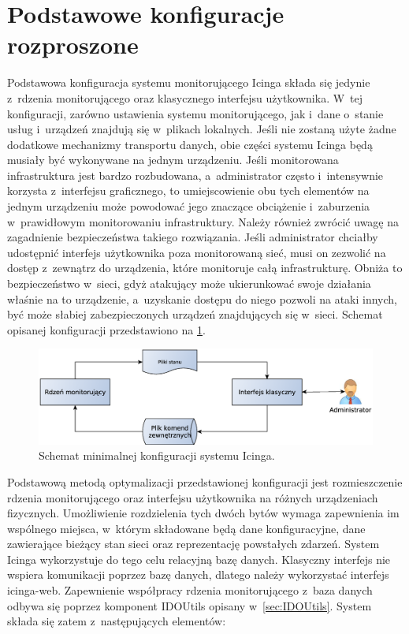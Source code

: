 \section[Konfiguracje rozproszone][Podstawowe konfiguracje rozproszone]{Podstawowe konfiguracje rozproszone}

Podstawowa konfiguracja systemu monitorującego Icinga składa się
jedynie z~rdzenia monitorującego oraz klasycznego interfejsu
użytkownika. W~tej konfiguracji, zarówno ustawienia systemu
monitorującego, jak i~dane o~stanie usług i~urządzeń znajdują się
w~plikach lokalnych. Jeśli nie zostaną użyte żadne dodatkowe
mechanizmy transportu danych, obie części systemu Icinga będą musiały
być wykonywane na jednym urządzeniu. Jeśli monitorowana infrastruktura
jest bardzo rozbudowana, a~administrator często i~intensywnie korzysta
z~interfejsu graficznego, to umiejscowienie obu tych elementów na
jednym urządzeniu może powodować jego znaczące obciążenie i~zaburzenia
w~prawidłowym monitorowaniu infrastruktury. Należy również zwrócić
uwagę na zagadnienie bezpieczeństwa takiego rozwiązania. Jeśli
administrator chciałby udostępnić interfejs użytkownika poza
monitorowaną sieć, musi on zezwolić na dostęp z~zewnątrz do
urządzenia, które monitoruje całą infrastrukturę. Obniża to
bezpieczeństwo w~sieci, gdyż atakujący może ukierunkować swoje
działania właśnie na to urządzenie, a~uzyskanie dostępu do niego
pozwoli na ataki innych, być może słabiej zabezpieczonych urządzeń
znajdujących się w~sieci. Schemat opisanej konfiguracji przedstawiono
na \ref{fig:icingaMini}.

\begin{figure}[ht]
  \caption{Schemat minimalnej konfiguracji systemu Icinga.}
  \label{fig:icingaMini}
\includegraphics[width=1\textwidth]{img/icingaMini}
\end{figure}

Podstawową metodą optymalizacji przedstawionej konfiguracji jest
rozmieszczenie rdzenia monitorującego oraz interfejsu użytkownika na
różnych urządzeniach fizycznych. Umożliwienie rozdzielenia tych dwóch
bytów wymaga zapewnienia im wspólnego miejsca, w~którym składowane
będą dane konfiguracyjne, dane zawierające bieżący stan sieci oraz
reprezentację powstałych zdarzeń. System Icinga wykorzystuje do tego
celu relacyjną bazę danych. Klasyczny interfejs nie wspiera
komunikacji poprzez bazę danych, dlatego należy wykorzystać interfejs
icinga-web. Zapewnienie współpracy rdzenia monitorującego z~baza
danych odbywa się poprzez komponent IDOUtils opisany
w~\ref{sec:IDOUtils}. System składa się zatem z~następujących
elementów:

